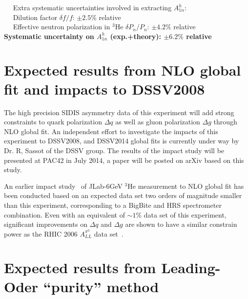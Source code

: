 \vspace{0.0mm}
\noindent ~\hspace{-0.4cm} ~Extra systematic uncertainties involved in extracting $A_{1n}^h$:  \\
\noindent ~\hspace{0.25cm} ~Dilution factor $\delta f/f$:        \hfill           $\pm 2.5 \%$  relative \\
\noindent ~\hspace{0.25cm} ~Effective neutron polarization in $^3$He $\delta P_n/P_n$:  \hfill           $\pm 4.2\%$  relative \\ 
\vspace{-3.0mm}
{\bf 
\noindent \hspace{0.5cm} Systematic uncertainty on $A_{1n}^h$ (exp.+theory):  \hfill          $\pm 6.2 \%$  relative } \\

\section{Expected results from NLO global fit and impacts to DSSV2008}

The high precision SIDIS asymmetry data of this experiment will add strong constraints to quark polarization $\Delta q$ as well as gluon polarization $\Delta g$ through NLO global fit. An independent effort to investigate the impacts of this experiment to DSSV2008, and DSSV2014 global fits is currently under way by Dr. R, Sassot of the  DSSV group.   The results of the impact study will be presented at PAC42 in July 2014,  a paper will be posted on arXiv based on this  study.    

An earlier impact study~\cite{epjcxj2006} of JLab-6GeV $^3$He measurement  to NLO global fit has been conducted based on an expected data set two orders of magnitude smaller than this experiment, corresponding to a BigBite and HRS spectrometer combination.  Even with an equivalent of $\sim 1\%$ data set of this experiment, significant improvements on $\Delta q$ and $\Delta g$ are shown to have a similar constrain power as the RHIC 2006 $A_{LL}^{\pi^0}$ data set~\cite{epjcxj2006}.     

\section{Expected results from Leading-Oder ``purity''  method}
